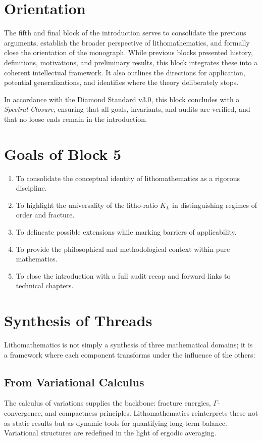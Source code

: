 \section*{Orientation}
The fifth and final block of the introduction serves to consolidate the previous arguments, establish the broader perspective of lithomathematics, and formally close the orientation of the monograph. While previous blocks presented history, definitions, motivations, and preliminary results, this block integrates these into a coherent intellectual framework. It also outlines the directions for application, potential generalizations, and identifies where the theory deliberately stops.  

In accordance with the Diamond Standard v3.0, this block concludes with a \emph{Spectral Closure}, ensuring that all goals, invariants, and audits are verified, and that no loose ends remain in the introduction.

\section*{Goals of Block 5}
\begin{enumerate}[label=G5.\arabic*., leftmargin=*]
\item To consolidate the conceptual identity of lithomathematics as a rigorous discipline.
\item To highlight the universality of the litho-ratio $K_L$ in distinguishing regimes of order and fracture.
\item To delineate possible extensions while marking barriers of applicability.
\item To provide the philosophical and methodological context within pure mathematics.
\item To close the introduction with a full audit recap and forward links to technical chapters.
\end{enumerate}

\section*{Synthesis of Threads}
Lithomathematics is not simply a synthesis of three mathematical domains; it is a framework where each component transforms under the influence of the others:

\subsection*{From Variational Calculus}
The calculus of variations supplies the backbone: fracture energies, $\Gamma$-convergence, and compactness principles. Lithomathematics reinterprets these not as static results but as dynamic tools for quantifying long-term balance. Variational structures are redefined in the light of ergodic averaging.

